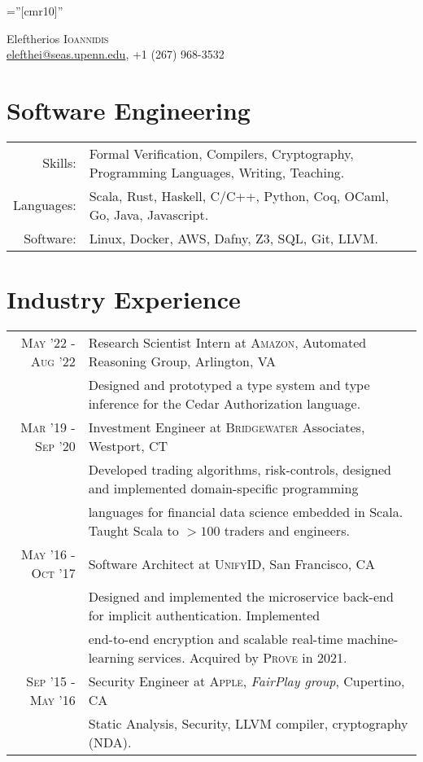 \documentclass[lettersize,11pt]{article}
\begin{document}
\pagestyle{empty} %
\font\fb=''[cmr10]'' %

\par{\centering
		{\Huge Eleftherios \textsc{Ioannidis}}\\[0.5em]
        \href{mailto:elefthei@seas.upenn.edu}{elefthei@seas.upenn.edu}, +1 (267) 968-3532 \\
	\bigskip\par}

\section{Software Engineering}
\begin{tabular}{rl}
Skills:& Formal Verification, Compilers, Cryptography, Programming Languages, Writing, Teaching. \\
Languages: & Scala, Rust, Haskell, C/C++, Python, Coq, OCaml, Go, Java, Javascript. \\
Software:& Linux, Docker, AWS, Dafny, Z3, SQL, Git, LLVM. \\
\end{tabular}

\section{Industry Experience}
\begin{tabular}{rl}
\textsc{May} '22 - \textsc{Aug} '22 & Research Scientist Intern at \textsc{Amazon}, Automated Reasoning Group, Arlington, VA\\
&\footnotesize{Designed and prototyped a type system and type inference for the Cedar Authorization language.}\\[0.5em]

\textsc{Mar} '19 - \textsc{Sep} '20 & Investment Engineer at \textsc{Bridgewater} Associates, Westport, CT\\
&\footnotesize{Developed trading algorithms, risk-controls, designed and implemented domain-specific programming}\\
&\footnotesize{languages for financial data science embedded in Scala. Taught Scala to $>100$ traders and engineers.}\\[0.5em]

\textsc{May} '16 - \textsc{Oct} '17 & Software Architect at \textsc{UnifyID}, San Francisco, CA\\
&\footnotesize{Designed and implemented the microservice back-end for implicit authentication. Implemented}\\
&\footnotesize{end-to-end encryption and scalable real-time machine-learning services. Acquired by \textsc{Prove} in 2021.}\\[0.5em]

\textsc{Sep} '15 - \textsc{May} '16 & Security Engineer at \textsc{Apple}, \emph{FairPlay group}, Cupertino, CA \\
&\footnotesize{Static Analysis, Security, LLVM compiler, cryptography (NDA).}\\[0.5em]
\end{tabular}
\end{document}
